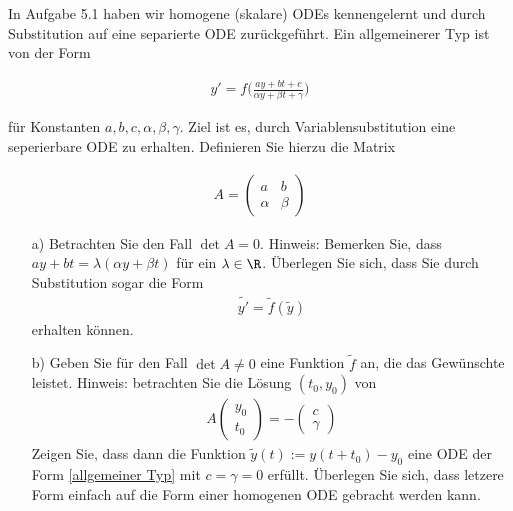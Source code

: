 \begin{exercise}
  In Aufgabe 5.1 haben wir homogene (skalare) ODEs kennengelernt und durch
  Substitution auf eine separierte ODE zurückgeführt. Ein allgemeinerer Typ ist
  von der Form

  \begin{align} \label{allgemeiner Typ}
    y' = f \bigg(\frac{ay + bt + c}{\alpha y + \beta t + \gamma}
    \bigg)
  \end{align}

  für Konstanten $a,b,c,\alpha ,\beta ,\gamma$. Ziel ist es, durch Variablensubstitution
  eine seperierbare ODE zu erhalten. Definieren Sie hierzu die Matrix

  \begin{align*}
    A = \left(
      \begin{array}{cc}
        a & b \\
        \alpha & \beta
      \end{array}
    \right)
  \end{align*}

  \begin{itemize}
    \item[a)] Betrachten Sie den Fall $\det A = 0$. Hinweis: Bemerken Sie, dass
    $ay +bt = \lambda (\alpha y + \beta t)$ für ein $\lambda \in \R$. Überlegen
    Sie sich, dass Sie durch Substitution sogar die Form
    \begin{align*}
      \tilde{y'}=\tilde{f}(\tilde{y})
    \end{align*}
    erhalten können.

    \item[b)] Geben Sie für den Fall $\det A \neq 0$ eine Funktion $\tilde{f}$ an,
    die das Gewünschte leistet. Hinweis: betrachten Sie die Lösung $(t_0 , y_0 )$
    von
    \begin{align*}
      A\left(
      \begin{array}{c}
        y_0 \\
        t_0
      \end{array}
      \right) = -\left(
      \begin{array}{c}
        c \\
        \gamma
      \end{array}
      \right)
    \end{align*}
    Zeigen Sie, dass dann die Funktion $\tilde{y}(t) := y(t + t_0 ) - y_0$ eine
    ODE der Form \eqref{allgemeiner Typ} mit $c = \gamma = 0$ erfüllt. Überlegen
    Sie sich, dass letzere Form einfach auf die Form einer homogenen ODE gebracht
    werden kann.
  \end{itemize}
\end{exercise}


